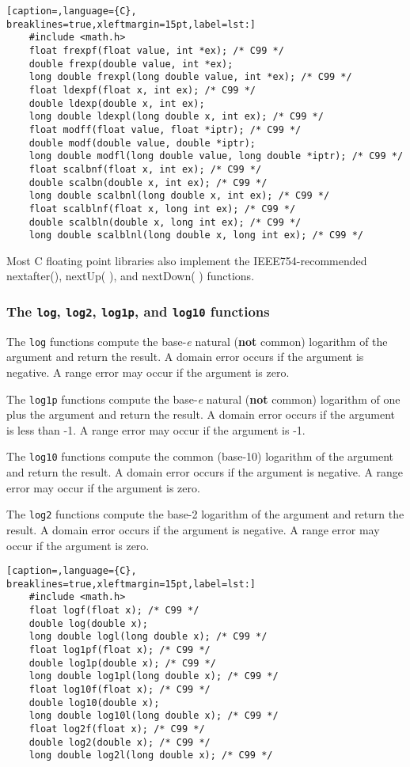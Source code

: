 \lstset{basicstyle=\scriptsize, numbers=left, captionpos=b, tabsize=4}
\begin{lstlisting}[caption=,language={C},
breaklines=true,xleftmargin=15pt,label=lst:]
	#include <math.h>
	float frexpf(float value, int *ex); /* C99 */
	double frexp(double value, int *ex);
	long double frexpl(long double value, int *ex); /* C99 */
	float ldexpf(float x, int ex); /* C99 */
	double ldexp(double x, int ex);
	long double ldexpl(long double x, int ex); /* C99 */
	float modff(float value, float *iptr); /* C99 */
	double modf(double value, double *iptr); 
	long double modfl(long double value, long double *iptr); /* C99 */
	float scalbnf(float x, int ex); /* C99 */
	double scalbn(double x, int ex); /* C99 */
	long double scalbnl(long double x, int ex); /* C99 */
	float scalblnf(float x, long int ex); /* C99 */
	double scalbln(double x, long int ex); /* C99 */
	long double scalblnl(long double x, long int ex); /* C99 */
\end{lstlisting}

Most C floating point libraries also implement the IEEE754-recommended
nextafter(), nextUp( ), and nextDown( ) functions.

\subsubsection{The \texttt{log}, \texttt{log2}, \texttt{log1p}, and \texttt{log10} functions}
The \texttt{log} functions compute the base-\emph{e} natural (\textbf{not}
common) logarithm of the argument and return the result. A domain error occurs
if the argument is negative. A range error may occur if the argument is zero.

The \texttt{log1p} functions compute the base-\emph{e} natural (\textbf{not}
common) logarithm of one plus the argument and return the result. A domain
error occurs if the argument is less than -1. A range error may occur if the
argument is -1.

The \texttt{log10} functions compute the common (base-10) logarithm of the
argument and return the result. A domain error occurs if the argument is
negative. A range error may occur if the argument is zero.

The \texttt{log2} functions compute the base-2 logarithm of the argument and
return the result. A domain error occurs if the argument is negative. A range
error may occur if the argument is zero.

\lstset{basicstyle=\scriptsize, numbers=left, captionpos=b, tabsize=4}
\begin{lstlisting}[caption=,language={C},
breaklines=true,xleftmargin=15pt,label=lst:]
	#include <math.h>
	float logf(float x); /* C99 */
	double log(double x);
	long double logl(long double x); /* C99 */
	float log1pf(float x); /* C99 */
	double log1p(double x); /* C99 */
	long double log1pl(long double x); /* C99 */
	float log10f(float x); /* C99 */
	double log10(double x);
	long double log10l(long double x); /* C99 */
	float log2f(float x); /* C99 */
	double log2(double x); /* C99 */
	long double log2l(long double x); /* C99 */
\end{lstlisting}

